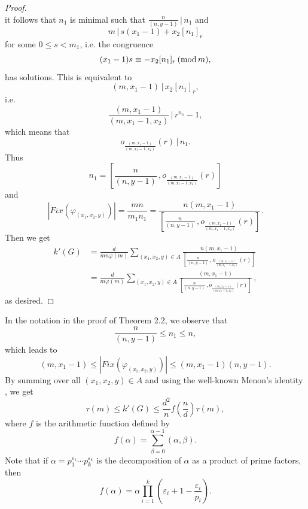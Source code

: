 \documentclass[12pt]{article}
\newcommand{\dd}{\displaystyle }
\newcommand{\0}{{\leqno}}
\begin{document}
\begin{proof}
\begin{equation}
\end{equation}it follows that $n_1$ is minimal such that $\frac{n}{(n,y-1)}\,|\,n_1$ and
\begin{equation}
\!\!m\,|\,s(x_1-1)+x_2[n_1]_r\nonumber
\end{equation}for some $0\leq s<m_1$, i.e. the congruence
\begin{equation}
(x_1-1)s\equiv -x_2[n_1]_r\, ({\rm mod}\, m),\nonumber
\end{equation}has solutions. This is equivalent to
\begin{equation}
(m,x_1-1)\,|\,x_2[n_1]_r,\nonumber
\end{equation}i.e.
\begin{equation}
\frac{(m,x_1-1)}{(m,x_1-1,x_2)}\,|\,r^{n_1}-1,\nonumber
\end{equation}which means that
\begin{equation}
o_{\frac{(m,x_1-1)}{(m,x_1-1,x_2)}}(r)\,|\,n_1.\nonumber
\end{equation}Thus
\begin{equation}
n_1=\left[\frac{n}{(n,y-1)}\,, o_{\frac{(m,x_1-1)}{(m,x_1-1,x_2)}}(r)\right]\nonumber
\end{equation}and
\begin{equation}
|Fix(\varphi_{(x_1,x_2,y)})|=\frac{mn}{m_1n_1}=\frac{n(m,x_1-1)}{\left[\frac{n}{(n,y-1)}\,, o_{\frac{(m,x_1-1)}{(m,x_1-1,x_2)}}(r)\right]}.\nonumber
\end{equation}Then we get
\begin{align*}
k'(G)&=\dd\frac{d}{mn\varphi(m)}\dd\sum_{(x_1,x_2,y)\in A}\frac{n(m,x_1-1)}{\left[\frac{n}{(n,y-1)}\,, o_{\frac{(m,x_1-1)}{(m,x_1-1,x_2)}}(r)\right]}\\
&=\dd\frac{d}{m\varphi(m)}\dd\sum_{(x_1,x_2,y)\in A}\frac{(m,x_1-1)}{\left[\frac{n}{(n,y-1)}\,, o_{\frac{(m,x_1-1)}{(m,x_1-1,x_2)}}(r)\right]}\,,\nonumber
\end{align*}as desired.
\end{proof}

In the notation in the proof of Theorem 2.2, we observe that
\begin{equation}
\frac{n}{(n,y-1)}\leq n_1\leq n,\nonumber
\end{equation}which leads to
\begin{equation}
(m,x_1-1)\leq |Fix(\varphi_{(x_1,x_2,y)})|\leq (m,x_1-1)(n,y-1).\nonumber
\end{equation}By summing over all $(x_1,x_2,y)\in A$ and using the well-known Menon's identity \cite{7}, we get
\begin{equation}
\tau(m)\leq k'(G)\leq\frac{d^2}{n}f\left(\frac{n}{d}\right)\tau(m),\nonumber
\end{equation}where $f$ is the arithmetic function defined by $$f(\alpha)=\sum_{\beta=0}^{\alpha-1}(\alpha,\beta).$$Note that if $\alpha=p_1^{\varepsilon_1}\cdots p_k^{\varepsilon_k}$ is the decomposition of $\alpha$ as a product of prime factors, then $$f(\alpha)=\alpha\prod_{i=1}^k\left(\varepsilon_i+1-\frac{\varepsilon_i}{p_i}\right).$$
\smallskip
\end{document}
